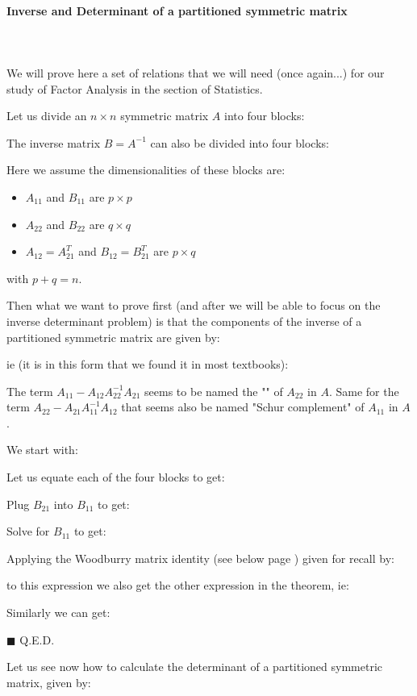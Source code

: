 	\paragraph{Inverse and Determinant of a partitioned symmetric matrix}\label{inverse of a partitioned symmetric matrix}\mbox{}\\\\
	We will prove here a set of relations that we will need (once again...) for our study of Factor Analysis in the section of Statistics.
	
	Let us divide an $n\times n$ symmetric matrix $A$ into four blocks:
	
	The inverse matrix ${ B}={ A}^{-1}$ can also be divided into four blocks:
	
	Here we assume the dimensionalities of these blocks are:
	\begin{itemize}
		\item $A_{11}$ and $B_{11}$ are $p\times p$
		\item $A_{22}$ and $B_{22}$ are $q\times q$
		\item $A_{12}=A_{21}^T$ and $B_{12}=B_{21}^T$ are $p\times q$
	\end{itemize}
	with $p+q=n$. 
	
	Then what we want to prove first (and after we will be able to focus on the inverse determinant problem) is that the components of the inverse of a partitioned symmetric matrix are given by:
	
	ie (it is in this form that we found it in most textbooks):
	
	\begin{tcolorbox}[title=Remark,colframe=black,arc=10pt]
	The term $A_{11}-A_{12} A_{22}^{-1} A_{21}$ seems to be named the "" of $A_{22}$ in $A$. Same for the term $A_{22}-A_{21} A_{11}^{-1} A_{12}$ that seems also be named "Schur complement" of $A_{11}$ in $A$.
	\end{tcolorbox}
	\begin{dem}
	We start with:
	
	Let us equate each of the four blocks to get:
	
	Plug $B_{21}$ into $B_{11}$ to get:
	
	Solve for $B_{11}$ to get:
	
	Applying the Woodburry matrix identity (see below page \pageref{Woodbury matrix identity}) given for recall by:
		
	to this expression we also get the other expression in the theorem, ie:
		
	Similarly we can get:
	
	
	\begin{flushright}
		$\blacksquare$  Q.E.D.
	\end{flushright}
	\end{dem}
	Let us see now how to calculate the determinant of a partitioned symmetric matrix\label{determinant of a partitioned symmetric matrix}, given by:
	
